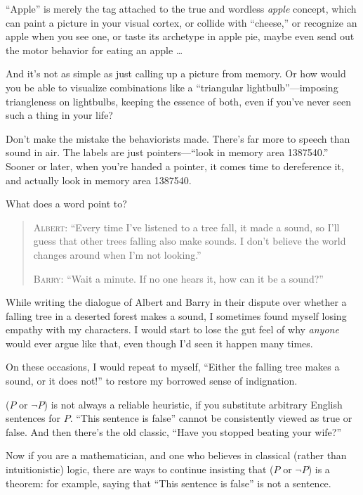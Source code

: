 {
 ``Apple'' is merely the tag
attached to the true and wordless \textit{apple} concept, which can
paint a picture in your visual cortex, or collide with
``cheese,'' or recognize an apple
when you see one, or taste its archetype in apple pie, maybe even send
out the motor behavior for eating an apple \ldots}

{
 And it's not as simple as just calling up a
picture from memory. Or how would you be able to visualize combinations
like a ``triangular
lightbulb''---imposing triangleness on lightbulbs,
keeping the essence of both, even if you've never seen
such a thing in your life?}

{
 Don't make the mistake the behaviorists made.
There's far more to speech than sound in air. The
labels are just pointers---``look in memory area
1387540.'' Sooner or later, when
you're handed a pointer, it comes time to dereference
it, and actually look in memory area 1387540.}

{
 What does a word point to?}

\myendsectiontext


\bigskip


\begin{quotation}
{
 \textsc{Albert}: ``Every time I've
listened to a tree fall, it made a sound, so I'll guess
that other trees falling also make sounds. I don't
believe the world changes around when I'm not
looking.''}

{
 \textsc{Barry}: ``Wait a minute. If no one hears it, how
 can it be a sound?''}
\end{quotation}

{
 While writing the dialogue of Albert and Barry in their dispute
over whether a falling tree in a deserted forest makes a sound, I
sometimes found myself losing empathy with my characters. I would start
to lose the gut feel of why \textit{anyone} would ever argue like that,
even though I'd seen it happen many times.}

{
 On these occasions, I would repeat to myself,
``Either the falling tree makes a sound, or it does
not!'' to restore my borrowed sense of indignation.}

{
 ($P$ or $\lnot P$) is not always a reliable heuristic, if you
substitute arbitrary English sentences for $P$. ``This
sentence is false'' cannot be consistently viewed as
true or false. And then there's the old classic,
``Have you stopped beating your
wife?''}

{
 Now if you are a mathematician, and one who believes in classical
(rather than intuitionistic) logic, there are ways to continue
insisting that ($P$ or $\lnot P$) is a theorem: for example, saying
that ``This sentence is false'' is
not a sentence.}

